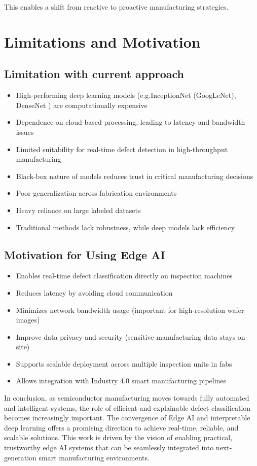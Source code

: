 This enables a shift from reactive to proactive manufacturing strategies.
\section {Limitations and Motivation}
\subsection {Limitation with current approach }
\begin{itemize}
\item High-performing deep learning models (e.g.InceptionNet (GoogLeNet), DenseNet ) are computationally expensive
\item Dependence on cloud-based processing, leading to latency and bandwidth issues
\item Limited suitability for real-time defect detection in high-throughput manufacturing
\item Black-box nature of models reduces trust in critical manufacturing decisions
\item Poor generalization across fabrication environments
\item Heavy reliance on large labeled datasets
\item Traditional methods lack robustness, while deep models lack efficiency
\end{itemize} 

\subsection {Motivation for Using Edge AI}
\begin{itemize}
\item Enables real-time defect classification directly on inspection machines
\item Reduces latency by avoiding cloud communication
\item Minimizes network bandwidth usage (important for high-resolution wafer images)
\item Improve data privacy and security (sensitive manufacturing data stays on-site)
\item Supports scalable deployment across multiple inspection units in fabs
\item Allows integration with Industry 4.0 smart manufacturing pipelines
\end{itemize}

In conclusion, as semiconductor manufacturing moves towards fully automated and intelligent systems, the role of efficient and explainable defect classification becomes increasingly important. The convergence of Edge AI and interpretable deep learning offers a promising direction to achieve real-time, reliable, and scalable solutions. This work is driven by the vision of enabling practical, trustworthy edge AI systems that can be seamlessly integrated into next-generation smart manufacturing environments.